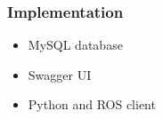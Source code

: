 \begin{frame}
    \frametitle{Implementation}
    \begin{itemize}
        \item MySQL database
        \item Swagger UI
        \item Python and ROS client
    \end{itemize}
    
\end{frame}